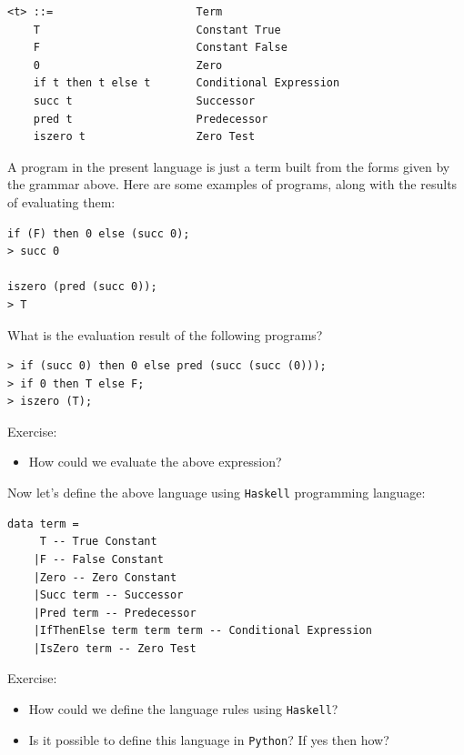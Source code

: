 \documentclass[11pt]{article}
\begin{document}
\begin{verbatim}
<t> ::=                      Term
    T                        Constant True
    F                        Constant False
    0                        Zero
    if t then t else t       Conditional Expression
    succ t                   Successor
    pred t                   Predecessor
    iszero t                 Zero Test
\end{verbatim}

A program in the present language is just a term built from the forms given by
the grammar above. Here are some examples of programs, along with the results of
evaluating them:

\begin{verbatim}
if (F) then 0 else (succ 0);
> succ 0

iszero (pred (succ 0));
> T
\end{verbatim}


What is the evaluation result of the following programs?

\begin{verbatim}
> if (succ 0) then 0 else pred (succ (succ (0)));
> if 0 then T else F;
> iszero (T);
\end{verbatim}


Exercise:

\begin{itemize}
\item How could we evaluate the above expression?
\end{itemize}


Now let's define the above language using \texttt{Haskell} programming language:


\begin{verbatim}
data term =
     T -- True Constant
    |F -- False Constant
    |Zero -- Zero Constant
    |Succ term -- Successor
    |Pred term -- Predecessor
    |IfThenElse term term term -- Conditional Expression
    |IsZero term -- Zero Test
\end{verbatim}

Exercise:

\begin{itemize}
\item How could we define the language rules using \texttt{Haskell}?

\item Is it possible to define this language in \texttt{Python}? If yes then how?
\end{itemize}
\end{document}
